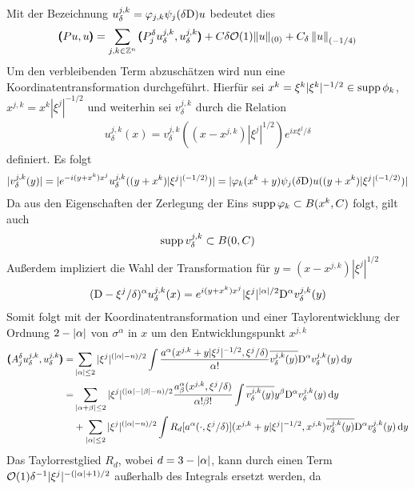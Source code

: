 Mit der Bezeichnung $u_\delta^{j,k} = \varphi_{j,k} \psi_j(\delta\mathrm D)u$ bedeutet dies
\begin{align}
\pmb(Pu,u\pmb) = \sum_{j,k\in\mathbb Z^n} \pmb(P^\delta_j u_\delta^{j,k},u_\delta^{j,k}\pmb) + C\delta\mathcal O(1)\lVert u\rVert _{(0)} + C_\delta \left\lVert u\right\rVert _{(-1/4)}
\end{align}
Um den verbleibenden Term abzuschätzen wird nun eine Koordinatentransformation durchgeführt. Hierfür sei $x^k = \xi^k |\xi^k|^{-1/2}\in\operatorname{supp} \phi_k$, $x^{j,k}=x^k |\xi^j|^{-1/2}$ und weiterhin sei $v^{j,k}_\delta$ durch die Relation
\begin{align}
u^{j,k}_\delta(x) = v^{j,k}_\delta ((x-x^{j,k})|\xi^j|^{1/2}) e^{ix\xi^j/\delta}
\end{align}
definiert. Es folgt
\begin{align}
|v^{j,k}_\delta(y)| = \lvert e^{-i(y+x^k)x^j}u^{j,k}_\delta((y+x^k)|\xi^j|^{(-1/2)})\rvert = |\varphi_k(x^k+y)\psi_j(\delta\mathrm D)u((y+x^k)|\xi^j|^{(-1/2)})|
\end{align}
Da aus den Eigenschaften der Zerlegung der Eins $\operatorname{supp} \varphi_k \subset B(x^k,C)$ folgt, gilt auch
\begin{align}
\operatorname{supp} v^{j,k}_\delta \subset B(0,C)
\end{align}
Außerdem impliziert die Wahl der Transformation für $y=(x-x^{j,k})|\xi^j|^{1/2}$
\begin{align}
(\mathrm D - \xi^j/\delta)^\alpha u^{j,k}_\delta(x)=  e^{i(y+x^k)x^j}|\xi^j|^{\lvert\alpha\rvert/2}\mathrm D^\alpha v^{j,k}_\delta(y)
\end{align}
Somit folgt mit der Koordinatentransformation und einer Taylorentwicklung der Ordnung $2-\lvert\alpha\rvert$ von $\sigma^\alpha$ in $x$ um den Entwicklungspunkt $x^{j,k}$
\begin{align}
\pmb(A^\delta_j u_\delta^{j,k},u_\delta^{j,k}\pmb)
=& \sum_{\lvert\alpha\rvert\le 2} |\xi^j|^{(\lvert\alpha\rvert-n)/2}\int \frac{a^\alpha(x^{j,k}+y|\xi^j|^{-1/2},\xi^j/\delta)}{\alpha!}\overline{v^{j,k}_\delta(y)}\mathrm D^\alpha v^{j,k}_\delta(y)\,\mathrm d y\nonumber\\ \label{termnachkoordtransf}
=& \sum_{\lvert\alpha+\beta\rvert\le 2}|\xi^j|^{(\lvert\alpha\rvert-\lvert\beta\rvert-n)/2} \frac{a^\alpha_\beta(x^{j,k},\xi^j/\delta)}{\alpha!\beta!}\int\overline{v^{j,k}_\delta(y)}y^\beta\mathrm D^\alpha v^{j,k}_\delta(y)\,\mathrm d y\\
&+\sum_{\lvert\alpha\rvert\le 2}|\xi^j|^{(\lvert\alpha\rvert-n)/2}\int R_{d}[a^\alpha(\cdot,\xi^j/\delta)](x^{j,k}+y|\xi^j|^{-1/2},x^{j,k})\overline{v^{j,k}_\delta(y)}\mathrm D^\alpha v^{j,k}_\delta(y)\,\mathrm d y\nonumber
\end{align}
Das Taylorrestglied $R_d$, wobei $d=3-\lvert\alpha\rvert$, kann durch einen Term $\mathcal O(1)\delta^{-1}|\xi^j|^{-(\lvert\alpha\rvert+1)/2}$ außerhalb des Integrals ersetzt werden, da
